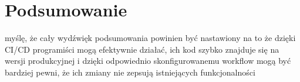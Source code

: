 \section{Podsumowanie}
myślę, że cały wydźwięk podsumowania powinien być nastawiony na to że dzięki CI/CD programiści mogą efektywnie działać, ich kod szybko znajduje się na wersji produkcyjnej i dzięki odpowiednio skonfigurowanemu workflow mogą być bardziej pewni, że ich zmiany nie zepsują istniejących funkcjonalności
